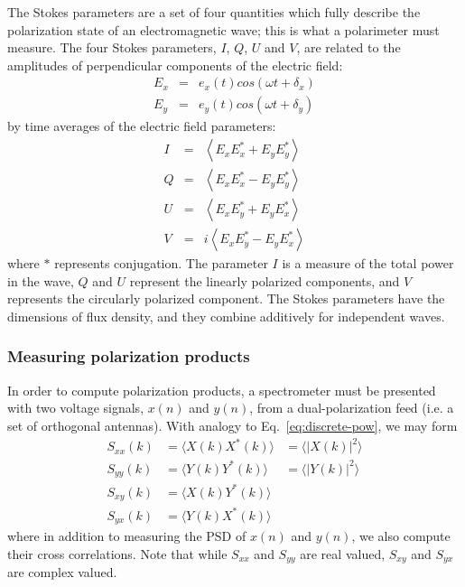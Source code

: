 \documentclass{ws-rv961x669}
\begin{document}
The Stokes parameters are a set of four quantities which fully describe the polarization state of an electromagnetic wave; this is what a polarimeter must measure. The four Stokes parameters, $I$, $Q$, $U$ and $V$, are related to the amplitudes of perpendicular components of the electric field:
\begin{eqnarray}
E_{x} & = & e_{x}(t)cos(\omega t+\delta_{x})\\
E_{y} & = & e_{y}(t)cos(\omega t+\delta_{y})
\end{eqnarray}
by time averages of the electric field parameters:
\begin{eqnarray}
I & = & \left\langle E_{x}E_{x}^{*}+E_{y}E_{y}^{*}\right\rangle \\
Q & = & \left\langle E_{x}E_{x}^{*}-E_{y}E_{y}^{*}\right\rangle \\
U & = & \left\langle E_{x}E_{y}^{*}+E_{y}E_{x}^{*}\right\rangle \\
V & = & i\left\langle E_{x}E_{y}^{*}-E_{y}E_{x}^{*}\right\rangle 
\end{eqnarray}
where $*$ represents conjugation. The parameter $I$ is a measure of the total power in the wave, $Q$ and $U$ represent the linearly polarized components, and $V$ represents the circularly polarized component. The Stokes parameters have the dimensions of flux density, and they combine additively for independent waves.

\subsubsection{Measuring polarization products}

In order to compute polarization products, a spectrometer must be presented with two voltage signals, $x(n)$ and $y(n)$, from a dual-polarization feed (i.e. a set of orthogonal antennas). With analogy to Eq.~\ref{eq:discrete-pow}, we may form 
\begin{eqnarray}
S_{xx}(k) & =  \langle X(k)X^*(k)\rangle  & = \langle |X(k)|^2\rangle \label{eq:sxx1} \\
S_{yy}(k) & =  \langle Y(k)Y^*(k)\rangle  & = \langle |Y(k)|^2\rangle \\
S_{xy}(k) & =  \langle X(k)Y^*(k)\rangle  & \\
S_{yx}(k) & =  \langle Y(k)X^*(k)\rangle  & \label{eq:sxx4}
\end{eqnarray}
where in addition to measuring the PSD of $x(n)$ and $y(n)$, we also compute their cross correlations.  Note that while $S_{xx}$ and $S_{yy}$ are real valued, $S_{xy}$ and $S_{yx}$ are complex valued.
\end{document}
